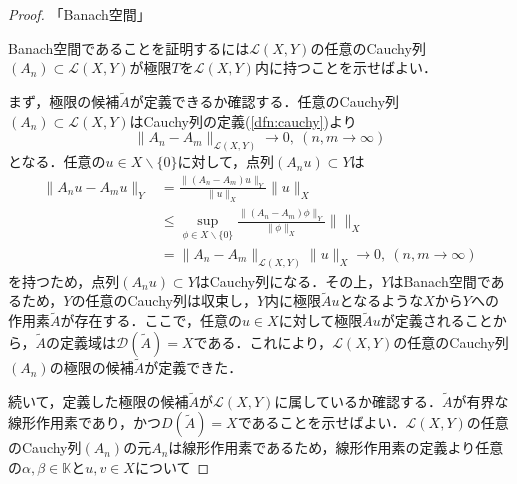 \documentclass[11pt,a4paper,titlepage]{jsreport}
\theoremstyle{definition}
\begin{document}
\begin{proof}
  「Banach空間」

  Banach空間であることを証明するには$\mathcal{L}(X,Y)$の任意のCauchy列$(A_n)\subset \mathcal{L}(X,Y)$が極限$T$を$\mathcal{L}(X,Y)$内に持つことを示せばよい．

  まず，極限の候補$\tilde{A}$が定義できるか確認する．任意のCauchy列$(A_n)\subset \mathcal{L}(X,Y)$はCauchy列の定義(\ref{dfn:cauchy})より
  \begin{equation*}
    \|A_n-A_m\|_{\mathcal{L}(X,Y)} \rightarrow 0,\ (n,m\rightarrow \infty)
  \end{equation*}
  となる．任意の$u\in X\backslash \{0\}$に対して，点列$(A_nu) \subset Y$は
  \begin{align*}
    \|A_n u-A_mu\|_Y & = \frac{\|(A_n-A_m)u\|_Y}{\|u\|_X}\|u\|_X                                         \\
                     & \leq \sup_{\phi\in X\backslash\{0\}} \frac{\|(A_n-A_m)\phi\|_Y}{\|\phi\|_X}\|\|_X \\
                     & = \|A_n-A_m\|_{\mathcal{L}(X,Y)}\|u\|_X \rightarrow 0,\ (n,m \rightarrow \infty)
  \end{align*}
  を持つため，点列$(A_nu)\subset Y$はCauchy列になる．その上，$Y$はBanach空間であるため，$Y$の任意のCauchy列は収束し，$Y$内に極限$\tilde{A}u$となるような$X$から$Y$への作用素$\tilde{A}$が存在する．ここで，任意の$u\in X$に対して極限$\tilde{A}u$が定義されることから，$\tilde{A}$の定義域は$\mathcal{D}(\tilde{A})=X$である．これにより，$\mathcal{L}(X,Y)$の任意のCauchy列$(A_n)$の極限の候補$\tilde{A}$が定義できた．

  続いて，定義した極限の候補$\tilde{A}$が$\mathcal{L}(X,Y)$に属しているか確認する．$\tilde{A}$が有界な線形作用素であり，かつ$D(\tilde{A})=X$であることを示せばよい．$\mathcal{L}(X,Y)$の任意のCauchy列$(A_n)$の元$A_n$は線形作用素であるため，線形作用素の定義より任意の$\alpha,\beta \in \mathbb{K}$と$u,v\in X$について


\end{proof}
\end{document}
